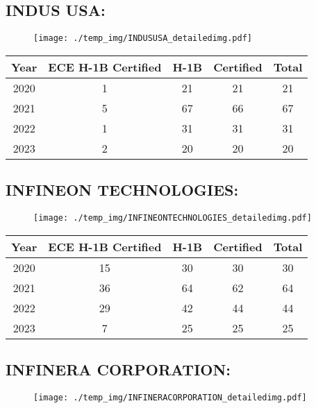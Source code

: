 \documentclass{article}%
\begin{document}
%
\newpage%
\subsection{INDUS USA:}%
\label{subsec:INDUSUSA}%
\label{INDUSUSAdetailed}%


\begin{figure}[htbp]%
\centering%
\texttt{[image: ./temp\_img/INDUSUSA\_detailedimg.pdf]}%
\end{figure}

%
\begin{longtable}{c|c|c|c|c}%
\hline%
Year&ECE H{-}1B Certified&H{-}1B&Certified&Total\\%
\hline%
2020&1&21&21&21\\%
\hline%
2021&5&67&66&67\\%
\hline%
2022&1&31&31&31\\%
\hline%
2023&2&20&20&20\\%
\hline%
\end{longtable}

%
\newpage%
\subsection{INFINEON TECHNOLOGIES:}%
\label{subsec:INFINEONTECHNOLOGIES}%
\label{INFINEONTECHNOLOGIESdetailed}%


\begin{figure}[htbp]%
\centering%
\texttt{[image: ./temp\_img/INFINEONTECHNOLOGIES\_detailedimg.pdf]}%
\end{figure}

%
\begin{longtable}{c|c|c|c|c}%
\hline%
Year&ECE H{-}1B Certified&H{-}1B&Certified&Total\\%
\hline%
2020&15&30&30&30\\%
\hline%
2021&36&64&62&64\\%
\hline%
2022&29&42&44&44\\%
\hline%
2023&7&25&25&25\\%
\hline%
\end{longtable}

%
\newpage%
\subsection{INFINERA CORPORATION:}%
\label{subsec:INFINERACORPORATION}%
\label{INFINERACORPORATIONdetailed}%


\begin{figure}[htbp]%
\centering%
\texttt{[image: ./temp\_img/INFINERACORPORATION\_detailedimg.pdf]}%
\end{figure}
\end{document}
